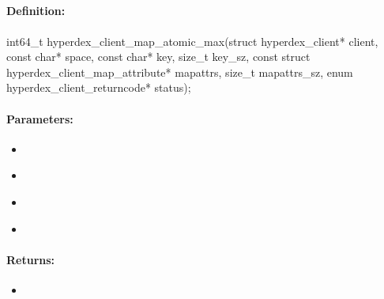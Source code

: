 \pagebreak
\subsection{}
\label{api:c:map_atomic_max}


\paragraph{Definition:}
\begin{ccode}
int64_t hyperdex_client_map_atomic_max(struct hyperdex_client* client,
        const char* space,
        const char* key, size_t key_sz,
        const struct hyperdex_client_map_attribute* mapattrs, size_t mapattrs_sz,
        enum hyperdex_client_returncode* status);
\end{ccode}

\paragraph{Parameters:}
\begin{itemize}[noitemsep]
\item {}\\

\item {}\\

\item {}\\

\item {}\\

\end{itemize}

\paragraph{Returns:}
\begin{itemize}[noitemsep]
\item {}\\

\end{itemize}

